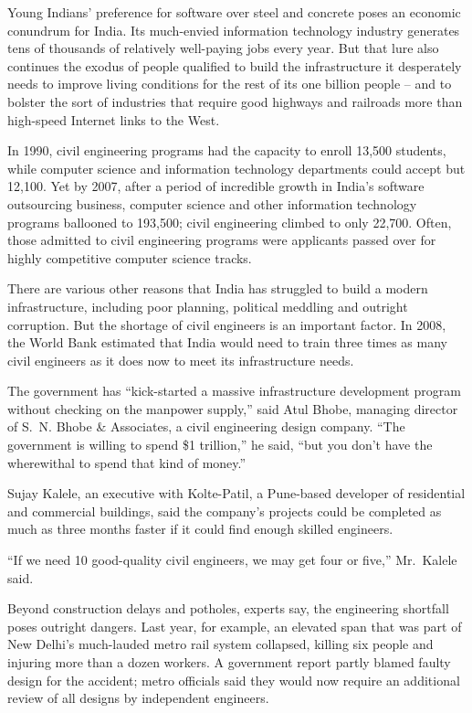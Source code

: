 ﻿\documentclass[12pt]{article}
\begin{document}
Young Indians' preference for software over steel and concrete poses an economic conundrum for
India. Its much-envied information technology industry generates tens of thousands of relatively
well-paying jobs every year. But that lure also continues the exodus of people qualified to build
the infrastructure it desperately needs to improve living conditions for the rest of its one billion
people -- and to bolster the sort of industries that require good highways and railroads more than
high-speed Internet links to the West.

In 1990, civil engineering programs had the capacity to enroll 13,500 students, while computer
science and information technology departments could accept but 12,100. Yet by 2007, after a period
of incredible growth in India's software outsourcing business, computer science and other
information technology programs ballooned to 193,500; civil engineering climbed to only 22,700.
Often, those admitted to civil engineering programs were applicants passed over for highly
competitive computer science tracks.

There are various other reasons that India has struggled to build a modern infrastructure, including
poor planning, political meddling and outright corruption. But the shortage of civil engineers is an
important factor. In 2008, the World Bank estimated that India would need to train three times as
many civil engineers as it does now to meet its infrastructure needs.

The government has ``kick-started a massive infrastructure development program without checking on
the manpower supply,'' said Atul Bhobe, managing director of S.~N. Bhobe \& Associates, a civil
engineering design company. ``The government is willing to spend \$1 trillion,'' he said, ``but you
don't have the wherewithal to spend that kind of money.''

Sujay Kalele, an executive with Kolte-Patil, a Pune-based developer of residential and commercial
buildings, said the company's projects could be completed as much as three months faster if it could
find enough skilled engineers.

``If we need 10 good-quality civil engineers, we may get four or five,'' Mr.~Kalele said.

Beyond construction delays and potholes, experts say, the engineering shortfall poses outright
dangers. Last year, for example, an elevated span that was part of New Delhi's much-lauded metro
rail system collapsed, killing six people and injuring more than a dozen workers. A government
report partly blamed faulty design for the accident; metro officials said they would now require an
additional review of all designs by independent engineers.
\end{document}
